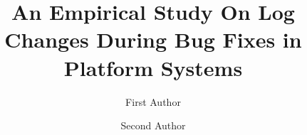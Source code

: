  \RequirePackage{fix-cm}
 \documentclass[smallextended]{svjour3}       %
 \smartqed  %
 
 \usepackage{graphicx}


%
\title{An Empirical Study On Log Changes During Bug Fixes in Platform Systems}

\author{First Author         \and
	Second Author %
}



